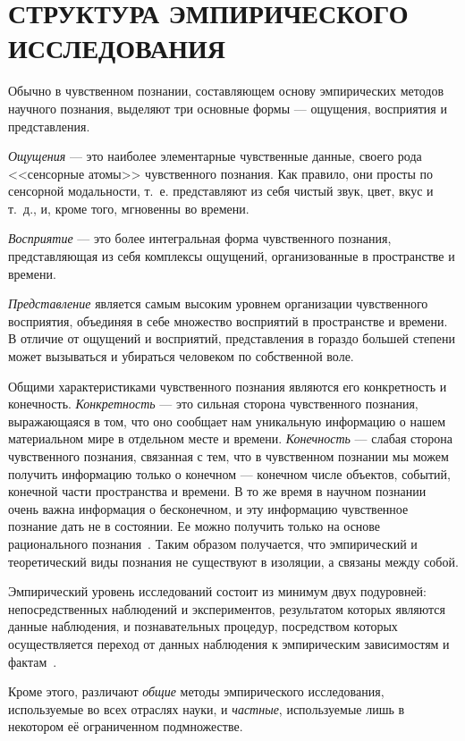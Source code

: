 \section[Структура эмпирического исследования]{%
  СТРУКТУРА ЭМПИРИЧЕСКОГО \\ ИССЛЕДОВАНИЯ
}

Обычно в чувственном познании, составляющем основу эмпирических методов научного познания,
выделяют три основные формы --- ощущения, восприятия и представления.

\emph{Ощущения} --- это наиболее элементарные чувственные данные,
своего рода <<сенсорные атомы>> чувственного познания.
Как правило, они просты по сенсорной модальности, т.~е. представляют из себя чистый звук,
цвет, вкус и т.~д., и, кроме того, мгновенны во времени.

\emph{Восприятие} --- это более интегральная форма чувственного познания,
представляющая из себя комплексы ощущений, организованные в пространстве и времени.

\emph{Представление} является самым высоким уровнем организации чувственного восприятия,
объединяя в себе множество восприятий в пространстве и времени.
В отличие от ощущений и восприятий, представления в гораздо большей степени может вызываться
и убираться человеком по собственной воле.

Общими характеристиками чувственного познания являются его конкретность и конечность.
\emph{Конкретность} --- это сильная сторона чувственного познания, выражающаяся в том,
что оно сообщает нам уникальную информацию о нашем материальном мире в отдельном месте и времени.
\emph{Конечность} --- слабая сторона чувственного познания, связанная с тем,
что в чувственном познании мы можем получить информацию только о конечном ---
конечном числе объектов, событий, конечной части пространства и времени.
В то же время в научном познании очень важна информация о бесконечном,
и эту информацию чувственное познание дать не в состоянии.
Ее можно получить только на основе рационального познания~\cite{moiseev2004}.
Таким образом получается, что эмпирический и теоретический виды познания
не существуют в изоляции, а связаны между собой.

Эмпирический уровень исследований состоит из минимум двух подуровней:
непосредственных наблюдений и экспериментов, результатом которых являются
данные наблюдения, и познавательных процедур, посредством которых осуществляется
переход от данных наблюдения к эмпирическим зависимостям и фактам~\cite{stepin1999}.

Кроме этого, различают \emph{общие} методы эмпирического исследования,
используемые во всех отраслях науки, и \emph{частные},
используемые лишь в некотором её ограниченном подмножестве.